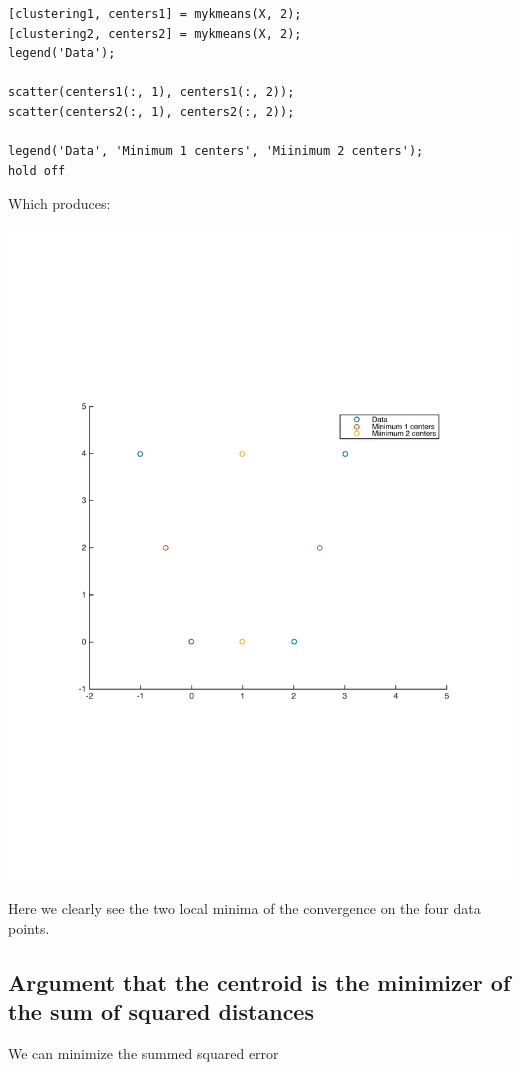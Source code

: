 \documentclass[11pt]{article}
\begin{document}
    \begin{lstlisting}
[clustering1, centers1] = mykmeans(X, 2);
[clustering2, centers2] = mykmeans(X, 2);
legend('Data');

scatter(centers1(:, 1), centers1(:, 2));
scatter(centers2(:, 1), centers2(:, 2));

legend('Data', 'Minimum 1 centers', 'Miinimum 2 centers');
hold off\end{lstlisting}

    Which produces:
    
    \begin{center}
    \includegraphics[width=\linewidth]{localminima}
    \end{center}
    
    Here we clearly see the two local minima of the convergence on the four data points.

\subsection{Argument that the centroid is the minimizer of the sum of squared distances}
    We can minimize the summed squared error
    
\end{document}
